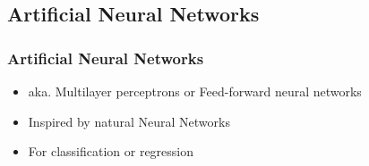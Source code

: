 \documentclass[aspectratio=169]{beamer}
\begin{document}

\subsection{Artificial Neural Networks}

\begin{frame}
  \begin{block}{}
    \begin{center}
      \frametitle{Artificial Neural Networks}
      \begin{itemize}
      \item aka. Multilayer perceptrons or Feed-forward neural networks
      \item Inspired by natural Neural Networks
      \item For classification or regression
      \end{itemize}
    \end{center}  
  \end{block}  
\end{frame}
\end{document}
